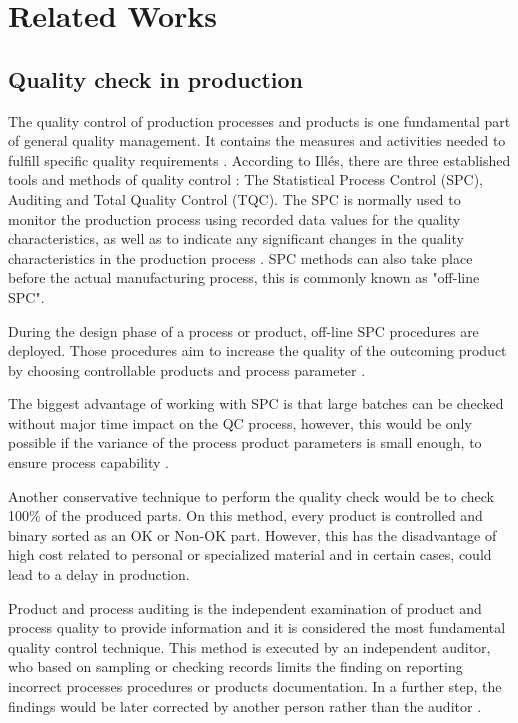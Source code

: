 \documentclass[5p,times,procedia]{elsarticle}
\begin{document}
\section{Related Works} %

\subsection{Quality check in production} \label{sec:qcp} %


The quality control of production processes and products is one fundamental part of general quality management. It contains the measures and activities needed to fulfill specific quality requirements \cite{illes2017new}.
According to Illés, there are three established tools and methods of quality control \cite{illes2017new}:
The Statistical Process Control (SPC), Auditing and Total Quality Control (TQC).   
The SPC is normally used to monitor the production process using recorded data values for the quality characteristics, as well as to indicate any significant changes in the quality characteristics in the production process \cite{selvamuthu2018introduction}. SPC methods can also take place before the actual manufacturing process, this is commonly known as "off-line SPC". 

During the design phase of a process or product, off-line SPC procedures are deployed. Those procedures aim to increase the quality of the outcoming product by choosing controllable products and  process parameter \cite{mitra2016fundamentals}.

The biggest advantage of working with SPC is that large batches can be checked without major time impact on the QC process, however, this would be only possible if the variance of the process product parameters is small enough, to ensure process capability \cite{kahle2013zuverlaessigkeitsanalyse}.

Another conservative technique to perform the quality check would be to check 100\% of the produced parts. On this method, every product is controlled and binary sorted as an OK or Non-OK part. However, this has the disadvantage of high cost related to personal or specialized material and in certain cases, could lead to a delay in production.

Product and process auditing is the independent examination of product and process quality to provide information and it is considered the most fundamental quality control technique. This method is executed by
an independent auditor, who based on sampling or checking records limits the finding on reporting incorrect processes procedures or products documentation. In a further step, the findings would be later corrected by another person rather than the auditor \cite{fox1993quality}. 
\end{document}
